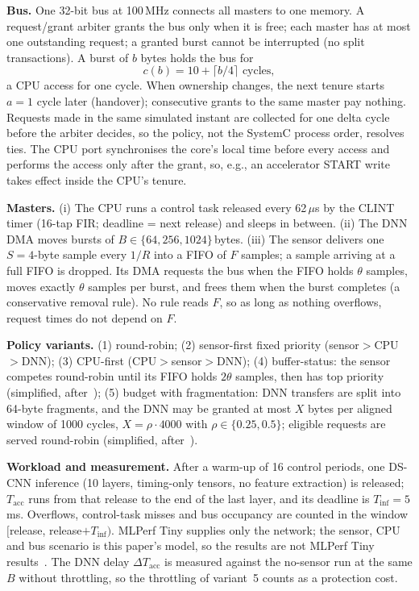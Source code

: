 \documentclass[conference]{IEEEtran}
\newcommand{\Tacc}{T_{\mathrm{acc}}}
\begin{document}
\textbf{Bus.} One 32-bit bus at 100\,MHz connects all masters to one memory. A request/grant arbiter grants the bus only when it is free; each master has at most one outstanding request; a granted burst cannot be interrupted (no split transactions). A burst of $b$ bytes holds the bus for
\begin{equation}
c(b) = 10 + \lceil b/4 \rceil \text{ cycles},\label{eq:burst}
\end{equation}
a CPU access for one cycle. When ownership changes, the next tenure starts $a=1$ cycle later (handover); consecutive grants to the same master pay nothing. Requests made in the same simulated instant are collected for one delta cycle before the arbiter decides, so the policy, not the SystemC process order, resolves ties. The CPU port synchronises the core's local time before every access and performs the access only after the grant, so, e.g., an accelerator START write takes effect inside the CPU's tenure.

\textbf{Masters.} (i) The CPU runs a control task released every 62\,$\mu$s by the CLINT timer (16-tap FIR; deadline = next release) and sleeps in between. (ii) The DNN DMA moves bursts of $B\in\{64,256,1024\}$\,bytes. (iii) The sensor delivers one $S=4$-byte sample every $1/R$ into a FIFO of $F$ samples; a sample arriving at a full FIFO is dropped. Its DMA requests the bus when the FIFO holds $\theta$ samples, moves exactly $\theta$ samples per burst, and frees them when the burst completes (a conservative removal rule). No rule reads $F$, so as long as nothing overflows, request times do not depend on $F$.

\textbf{Policy variants.} (1) round-robin; (2) sensor-first fixed priority (sensor$>$CPU$>$DNN); (3) CPU-first (CPU$>$sensor$>$DNN); (4) buffer-status: the sensor competes round-robin until its FIFO holds $2\theta$ samples, then has top priority (simplified, after~\cite{roh}); (5) budget with fragmentation: DNN transfers are split into 64-byte fragments, and the DNN may be granted at most $X$ bytes per aligned window of 1000 cycles, $X=\rho\cdot 4000$ with $\rho\in\{0.25,0.5\}$; eligible requests are served round-robin (simplified, after~\cite{axirealm,carfield}).

\textbf{Workload and measurement.} After a warm-up of 16 control periods, one DS-CNN inference (10 layers, timing-only tensors, no feature extraction) is released; $\Tacc$ runs from that release to the end of the last layer, and its deadline is $T_{\mathrm{inf}}=5$\,ms. Overflows, control-task misses and bus occupancy are counted in the window $[$release, release$+T_{\mathrm{inf}})$. MLPerf Tiny supplies only the network; the sensor, CPU and bus scenario is this paper's model, so the results are not MLPerf Tiny results~\cite{mlcommons}. The DNN delay $\Delta\Tacc$ is measured against the no-sensor run at the same $B$ without throttling, so the throttling of variant~5 counts as a protection cost.
\end{document}
